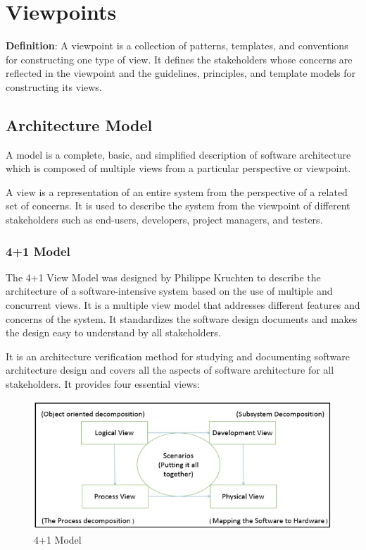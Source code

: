 \documentclass[10pt,oneside]{report}
\begin{document}
\chapter{Viewpoints}\label{ad:vps}

\textbf{Definition}: A viewpoint is a collection of patterns, templates, and conventions for constructing one type of view. It defines the stakeholders whose concerns are reflected in the viewpoint and the guidelines, principles, and template models for constructing its views.

\section{Architecture Model}\label{mk:list}

A model is a complete, basic, and simplified description of software architecture which is composed of multiple views from a particular perspective or viewpoint.

A view is a representation of an entire system from the perspective of a related set of concerns. It is used to describe the system from the viewpoint of different stakeholders such as end-users, developers, project managers, and testers.


\subsection{4+1 Model}\label{vp:mk}

The 4+1 View Model was designed by Philippe Kruchten to describe the architecture of a software-intensive system based on the use of multiple and concurrent views. It is a multiple view model that addresses different features and concerns of the system. It standardizes the software design documents and makes the design easy to understand by all stakeholders.

It is an architecture verification method for studying and documenting software architecture design and covers all the aspects of software architecture for all stakeholders. It provides four essential views:

\begin{figure}[h!]
\includegraphics[width=15cm]{four-plus-one-view-model.jpg}
\caption{4+1 Model}
\label{Basic Micro-services architecture pattern}
\end{figure}
\end{document}
